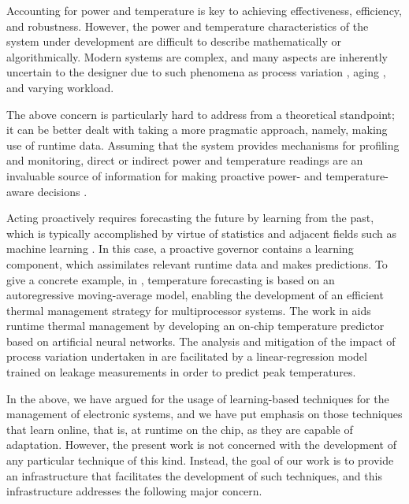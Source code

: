 Accounting for power and temperature is key to achieving effectiveness,
efficiency, and robustness. However, the power and temperature characteristics
of the system under development are difficult to describe mathematically or
algorithmically. Modern systems are complex, and many aspects are inherently
uncertain to the designer due to such phenomena as process variation
\cite{chandrakasan2000}, aging \cite{coskun2006}, and varying workload.

The above concern is particularly hard to address from a theoretical standpoint;
it can be better dealt with taking a more pragmatic approach, namely, making use
of runtime data. Assuming that the system provides mechanisms for profiling and
monitoring, direct or indirect power and temperature readings are an invaluable
source of information for making proactive power- and temperature-aware
decisions \cite{chaudhry2015, coskun2008}.

Acting proactively requires forecasting the future by learning from the past,
which is typically accomplished by virtue of statistics and adjacent fields such
as machine learning \cite{bishop2006}. In this case, a proactive governor
contains a learning component, which assimilates relevant runtime data and makes
predictions. To give a concrete example, in \cite{coskun2008}, temperature
forecasting is based on an autoregressive moving-average model, enabling the
development of an efficient thermal management strategy for multiprocessor
systems. The work in \cite{kumar2010} aids runtime thermal management by
developing an on-chip temperature predictor based on artificial neural networks.
The analysis and mitigation of the impact of process variation undertaken in
\cite{juan2014} are facilitated by a linear-regression model trained on leakage
measurements in order to predict peak temperatures.

In the above, we have argued for the usage of learning-based techniques for the
management of electronic systems, and we have put emphasis on those techniques
that learn online, that is, at runtime on the chip, as they are capable of
adaptation. However, the present work is not concerned with the development of
any particular technique of this kind. Instead, the goal of our work is to
provide an infrastructure that facilitates the development of such techniques,
and this infrastructure addresses the following major concern.

